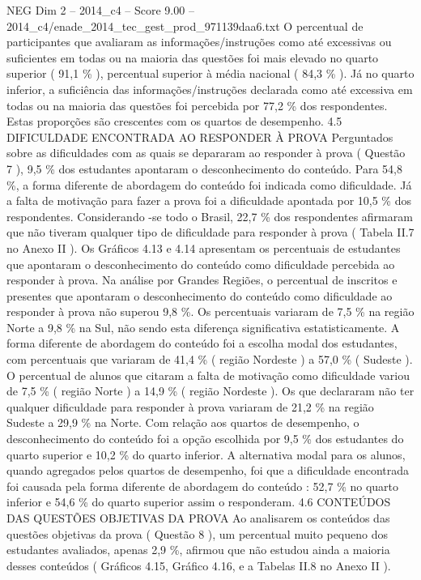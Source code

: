 \begin{textsample}{NEG Dim 2 – 2014\_c4 – Score 9.00 – 2014\_c4/enade\_2014\_tec\_gest\_prod\_971139daa6.txt}
O percentual de participantes que avaliaram as informações/instruções como até excessivas ou suficientes em todas ou na maioria das questões foi mais elevado no quarto superior ( 91,1 \% ), percentual superior à média nacional ( 84,3 \% ).
Já no quarto inferior, a suficiência das informações/instruções declarada como até excessiva em todas ou na maioria das questões foi percebida por 77,2 \% dos respondentes.
Estas proporções são crescentes com os quartos de desempenho. 4.5 DIFICULDADE ENCONTRADA AO RESPONDER À PROVA Perguntados sobre as dificuldades com as quais se depararam ao responder à prova ( Questão 7 ), 9,5 \% dos estudantes apontaram o desconhecimento do conteúdo.
Para 54,8 \%, a forma diferente de abordagem do conteúdo foi indicada como dificuldade.
Já a falta de motivação para fazer a prova foi a dificuldade apontada por 10,5 \% dos respondentes.
Considerando -se todo o Brasil, 22,7 \% dos respondentes afirmaram que não tiveram qualquer tipo de dificuldade para responder à prova ( Tabela II.7 no Anexo II ).
Os Gráficos 4.13 e 4.14 apresentam os percentuais de estudantes que apontaram o desconhecimento do conteúdo como dificuldade percebida ao responder à prova.
Na análise por Grandes Regiões, o percentual de inscritos e presentes que apontaram o desconhecimento do conteúdo como dificuldade ao responder à prova não superou 9,8 \%.
Os percentuais variaram de 7,5 \% na região Norte a 9,8 \% na Sul, não sendo esta diferença significativa estatisticamente.
A forma diferente de abordagem do conteúdo foi a escolha modal dos estudantes, com percentuais que variaram de 41,4 \% ( região Nordeste ) a 57,0 \% ( Sudeste ).
O percentual de alunos que citaram a falta de motivação como dificuldade variou de 7,5 \% ( região Norte ) a 14,9 \% ( região Nordeste ).
Os que declararam não ter qualquer dificuldade para responder à prova variaram de 21,2 \% na região Sudeste a 29,9 \% na Norte.
Com relação aos quartos de desempenho, o desconhecimento do conteúdo foi a opção escolhida por 9,5 \% dos estudantes do quarto superior e 10,2 \% do quarto inferior.
A alternativa modal para os alunos, quando agregados pelos quartos de desempenho, foi que a dificuldade encontrada foi causada pela forma diferente de abordagem do conteúdo : 52,7 \% no quarto inferior e 54,6 \% do quarto superior assim o responderam. 4.6 CONTEÚDOS DAS QUESTÕES OBJETIVAS DA PROVA Ao analisarem os conteúdos das questões objetivas da prova ( Questão 8 ), um percentual muito pequeno dos estudantes avaliados, apenas 2,9 \%, afirmou que não estudou ainda a maioria desses conteúdos ( Gráficos 4.15, Gráfico 4.16, e a Tabelas II.8 no Anexo II ).

\end{textsample}
